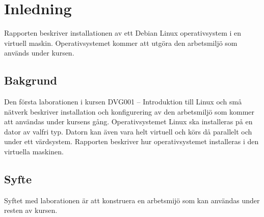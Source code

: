 \section{Inledning}\label{inledning}
Rapporten beskriver installationen av ett Debian Linux operativsystem i en
virtuell maskin. Operativsystemet kommer att utgöra den arbetsmiljö som används
under kursen.


\subsection{Bakgrund}
Den första laborationen i kursen DVG001 -- Introduktion till Linux och små
nätverk beskriver installation och konfigurering av den arbetsmiljö som kommer
att användas under kursens gång. Operativsystemet Linux ska installeras på en
dator av valfri typ.  Datorn kan även vara helt virtuell och körs då parallelt
och under ett värdsystem. Rapporten beskriver hur operativsystemet installeras
i den virtuella maskinen.


\subsection{Syfte}
Syftet med laborationen är att konstruera en arbetsmijö som kan användas under
resten av kursen.
